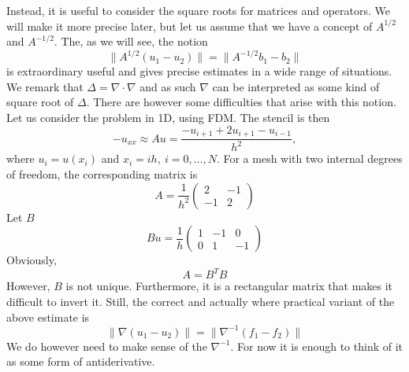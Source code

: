 Instead, it is useful to consider the square roots for matrices and operators. 
We will make it more precise later, but let us assume 
that we have a concept of 
$A^{1/2}$ and $A^{-1/2}$. The, as we will see,  the notion 
\[
\|A^{1/2}(u_1 - u_2) \| = \|A^{-1/2}b_1 - b_2\|     
\]
is extraordinary useful and gives precise estimates in a wide range of situations.  
We remark that $\Delta=\nabla\cdot\nabla$ and as such $\nabla$ can be interpreted
as some kind of square root of $\Delta$. There are however some difficulties that
arise with this notion. Let us consider the problem in 1D, using FDM. The stencil 
is then 
\[
- u_{xx} \approx A u =  \frac{-u_{i+1} + 2 u_{i+1}  -u_{i-1}}{h^2}, 
\]  
where $u_i= u(x_i)$ and $x_i = ih, \ i=0,\ldots, N$. 
For a mesh with two internal degrees of freedom, the corresponding matrix 
is 
\[
A = 
\frac{1}{h^2}\begin{pmatrix}
2 & -1 \\ -1 & 2 
\end{pmatrix}
\]
Let $B$ 
\[
B u = 
\frac{1}{h}\begin{pmatrix}
1 & -1 & 0  \\ 0 & 1 & -1  
\end{pmatrix}
\]
Obviously,  
\[
A = B^T B 
\]
However, $B$ is not unique. Furthermore, it is a rectangular matrix that makes
it difficult to invert it. Still, the correct and actually where practical 
variant of the above estimate is    
\[
\|\nabla (u_1 - u_2) \| = \|\nabla^{-1}(f_1 - f_2)\|     
\]
We do however need to make sense of the 
$\nabla^{-1}$. For now it is enough to think of it as some form of antiderivative. 





